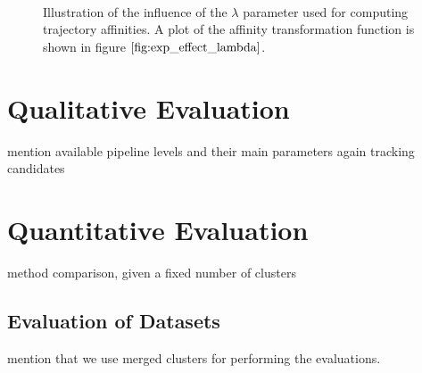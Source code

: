 \begin{figure}[H]
\begin{center}

~
\end{center}
\caption[Influence of Lambda Parameter]{Illustration of the influence of the $\lambda$ parameter used for computing trajectory affinities. A plot of the affinity transformation function is shown in figure $\ref{fig:exp_effect_lambda}$. }
\label{fig:cars_effect_of_lambda}
\end{figure}

\section{Qualitative Evaluation}
mention available pipeline levels and their main parameters again
tracking candidates

\section{Quantitative Evaluation}




method comparison, given a fixed number of clusters

\subsection{Evaluation of Datasets}
mention that we use merged clusters for performing the evaluations.

